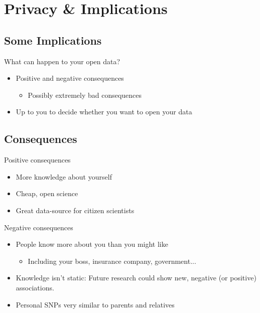 \documentclass[12pt,a4paper]{beamer}
\begin{document}
\section{Privacy \& Implications}
\subsection{Some Implications}
\begin{frame}{What can happen to your open data?}
\begin{itemize}
\item Positive and negative consequences
\begin{itemize}
\pause \item Possibly extremely bad consequences
\end{itemize}
\pause \item Up to you to decide whether you want to open your data
\end{itemize}
\end{frame}

\subsection{Consequences}
\begin{frame}{Positive consequences}
\begin{itemize}
\item More knowledge about yourself
\pause \item Cheap, open science
\pause \item Great data-source for citizen scientists
\end{itemize}
\end{frame}

\begin{frame}{Negative consequences}
\begin{itemize}
\item People know more about you than you might like
\begin{itemize}
\pause \item Including your boss, insurance company, government...
\end{itemize}
\pause \item Knowledge isn't static: Future research could show new, negative (or positive) associations. 
\pause \item Personal SNPs very similar to parents and relatives
\end{itemize}
\end{frame}
\end{document}

